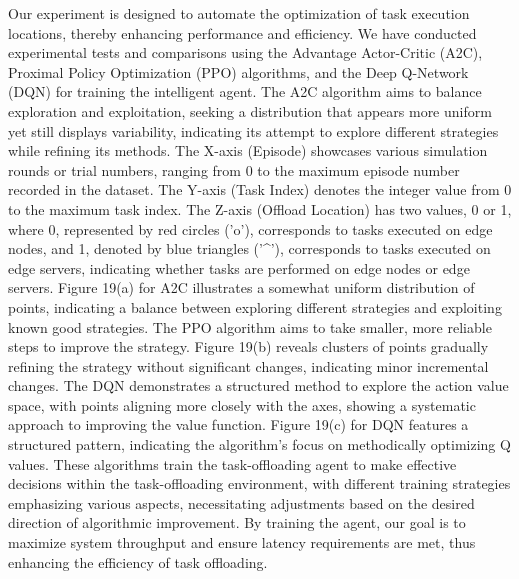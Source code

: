 \documentclass[preprint,12pt]{elsarticle}
\begin{document}
Our experiment is designed to automate the optimization of task execution locations, thereby enhancing performance and efficiency. We have conducted experimental tests and comparisons using the Advantage Actor-Critic (A2C), Proximal Policy Optimization (PPO) algorithms, and the Deep Q-Network (DQN) for training the intelligent agent. The A2C algorithm aims to balance exploration and exploitation, seeking a distribution that appears more uniform yet still displays variability, indicating its attempt to explore different strategies while refining its methods. The X-axis (Episode) showcases various simulation rounds or trial numbers, ranging from 0 to the maximum episode number recorded in the dataset. The Y-axis (Task Index) denotes the integer value from 0 to the maximum task index. The Z-axis (Offload Location) has two values, 0 or 1, where 0, represented by red circles ('o'), corresponds to tasks executed on edge nodes, and 1, denoted by blue triangles ('\^{}'), corresponds to tasks executed on edge servers, indicating whether tasks are performed on edge nodes or edge servers. Figure 19(a) for A2C illustrates a somewhat uniform distribution of points, indicating a balance between exploring different strategies and exploiting known good strategies. The PPO algorithm aims to take smaller, more reliable steps to improve the strategy. Figure 19(b) reveals clusters of points gradually refining the strategy without significant changes, indicating minor incremental changes. The DQN demonstrates a structured method to explore the action value space, with points aligning more closely with the axes, showing a systematic approach to improving the value function. Figure 19(c) for DQN features a structured pattern, indicating the algorithm's focus on methodically optimizing Q values. These algorithms train the task-offloading agent to make effective decisions within the task-offloading environment, with different training strategies emphasizing various aspects, necessitating adjustments based on the desired direction of algorithmic improvement. By training the agent, our goal is to maximize system throughput and ensure latency requirements are met, thus enhancing the efficiency of task offloading.
\end{document}
